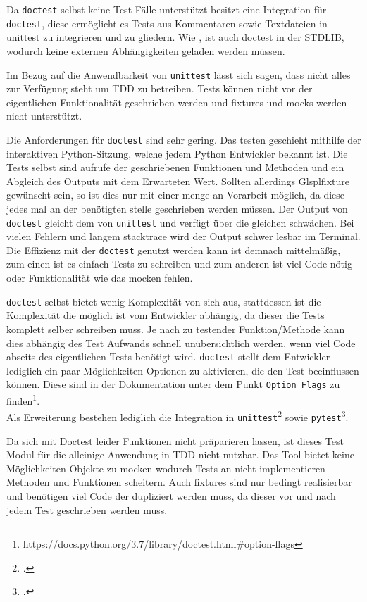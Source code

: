 Da \lstinline{doctest} selbst keine Test Fälle unterstützt besitzt
 eine Integration für \lstinline{doctest},
diese ermöglicht es Tests aus Kommentaren sowie Textdateien in unittest zu
integrieren und zu gliedern. Wie , ist auch
doctest in der STDLIB, wodurch keine externen Abhängigkeiten geladen werden
müssen.
\newline

Im Bezug auf die Anwendbarkeit von \lstinline{unittest} lässt sich sagen, dass
nicht alles zur Verfügung steht um TDD zu betreiben. Tests können nicht vor der
eigentlichen Funktionalität geschrieben werden und  \Glspl{fixture} und
\Glspl{mock} werden nicht unterstützt.

Die Anforderungen für \lstinline{doctest} sind sehr gering. Das testen geschieht
mithilfe der interaktiven Python-Sitzung, welche jedem Python Entwickler bekannt
ist. Die Tests selbst sind aufrufe der geschriebenen Funktionen und Methoden und
ein Abgleich des Outputs mit dem Erwarteten Wert. Sollten allerdings
Glspl{fixture} gewünscht sein, so ist dies nur mit einer menge an Vorarbeit
möglich, da diese jedes mal an der benötigten stelle geschrieben werden müssen.
Der Output von \lstinline{doctest} gleicht dem von \lstinline{unittest} und
verfügt über die gleichen schwächen. Bei vielen Fehlern und langem
\gls{stacktrace} wird der Output schwer lesbar im Terminal.
Die Effizienz mit der \lstinline{doctest} genutzt werden kann ist demnach
mittelmäßig, zum einen ist es einfach Tests zu schreiben und zum anderen ist
viel Code nötig oder Funktionalität wie das \gls{mock}en fehlen.

\lstinline{doctest} selbst bietet wenig Komplexität von sich aus,
stattdessen ist die Komplexität die möglich ist vom Entwickler abhängig, da
dieser die Tests komplett selber schreiben muss. Je nach zu testender
Funktion/Methode kann dies abhängig des Test Aufwands schnell unübersichtlich
werden, wenn viel Code abseits des eigentlichen Tests benötigt wird.
\lstinline{doctest} stellt dem Entwickler lediglich ein paar Möglichkeiten
Optionen zu aktivieren, die den Test beeinflussen können. Diese sind in der
Dokumentation unter dem Punkt \lstinline{Option Flags} zu
finden\footnote{https://docs.python.org/3.7/library/doctest.html\#option-flags}.
\\
Als Erweiterung bestehen lediglich die Integration in
\lstinline{unittest}\footcite{docs.python:doctest} sowie
\lstinline{pytest}\footcite{docs.pytest.org:4.4}.
\newline

Da sich mit Doctest leider Funktionen nicht präparieren lassen, ist dieses
Test Modul für die alleinige Anwendung in TDD nicht nutzbar. Das Tool bietet
keine Möglichkeiten Objekte zu \gls{mock}en wodurch Tests an nicht
implementieren Methoden und Funktionen scheitern. Auch \Glspl{fixture} sind nur
bedingt realisierbar und benötigen viel Code der dupliziert werden muss, da
dieser vor und nach jedem Test geschrieben werden muss.